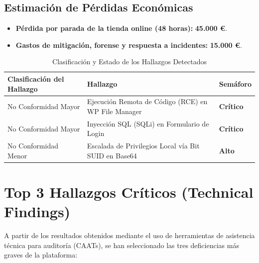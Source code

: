 \documentclass[11pt,a4paper]{report}
\begin{document}
\section*{Estimación de Pérdidas Económicas}
\begin{itemize}
    \item \textbf{Pérdida por parada de la tienda online (48 horas):} \textbf{45.000 €}.
    \item \textbf{Gastos de mitigación, forense y respuesta a incidentes:} \textbf{15.000 €}.
\end{itemize}

\vspace{0.6cm}
\begin{table}[h]
    \centering
    \caption{Clasificación y Estado de los Hallazgos Detectados}
    \begin{tabular}{m{4.5cm}m{6.5cm}l}
        \toprule
        \textbf{Clasificación del Hallazgo} & \textbf{Hallazgo} & \textbf{Semáforo} \\
        \midrule
        No Conformidad Mayor & Ejecución Remota de Código (RCE) en WP File Manager & \color{critred}\textbf{Crítico}\color{black} \\
        No Conformidad Mayor & Inyección SQL (SQLi) en Formulario de Login & \color{critred}\textbf{Crítico}\color{black} \\
        No Conformidad Menor & Escalada de Privilegios Local vía Bit SUID en Base64 & \color{warnorange}\textbf{Alto}\color{black} \\
        \bottomrule
    \end{tabular}
\end{table}

\newpage

\chapter{Top 3 Hallazgos Críticos (Technical Findings)}

A partir de los resultados obtenidos mediante el uso de herramientas de asistencia técnica para auditoría (CAATs), se han seleccionado las tres deficiencias más graves de la plataforma:
\end{document}
